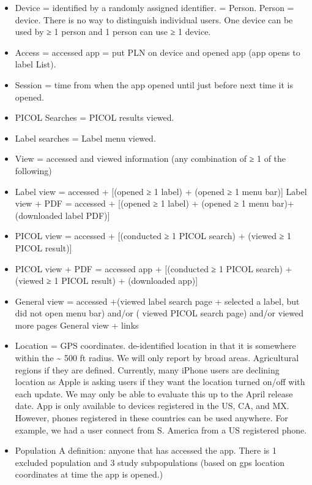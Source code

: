 \documentclass[
]{article}
\providecommand{\tightlist}{%
  \setlength{\itemsep}{0pt}\setlength{\parskip}{0pt}}
\begin{document}
\begin{itemize}
\tightlist
\item
  Device = identified by a randomly assigned identifier. = Person.
  Person = device. There is no way to distinguish individual users. One
  device can be used by ≥ 1 person and 1 person can use ≥ 1 device.
\item
  Access = accessed app = put PLN on device and opened app (app opens to
  label List).
\item
  Session = time from when the app opened until just before next time it
  is opened.
\item
  PICOL Searches = PICOL results viewed.
\item
  Label searches = Label menu viewed.
\item
  View = accessed and viewed information (any combination of ≥ 1 of the
  following)
\item
  Label view = accessed + {[}(opened ≥ 1 label) + (opened ≥ 1 menu
  bar){]} Label view + PDF = accessed + {[}(opened ≥ 1 label) + (opened
  ≥ 1 menu bar)+ (downloaded label PDF){]}
\item
  PICOL view = accessed + {[}(conducted ≥ 1 PICOL search) + (viewed ≥ 1
  PICOL result){]}
\item
  PICOL view + PDF = accessed app + {[}(conducted ≥ 1 PICOL search) +
  (viewed ≥ 1 PICOL result) + (downloaded app){]}
\item
  General view = accessed +(viewed label search page + selected a label,
  but did not open menu bar) and/or ( viewed PICOL search page) and/or
  viewed more pages General view + links
\item
  Location = GPS coordinates. de-identified location in that it is
  somewhere within the \textasciitilde{} 500 ft radius. We will only
  report by broad areas. Agricultural regions if they are defined.
  Currently, many iPhone users are declining location as Apple is asking
  users if they want the location turned on/off with each update. We may
  only be able to evaluate this up to the April release date. App is
  only available to devices registered in the US, CA, and MX. However,
  phones registered in these countries can be used anywhere. For
  example, we had a user connect from S. America from a US registered
  phone.
\item
  Population A definition: anyone that has accessed the app. There is 1
  excluded population and 3 study subpopulations (based on gps location
  coordinates at time the app is opened.)


\end{itemize}
\end{document}
